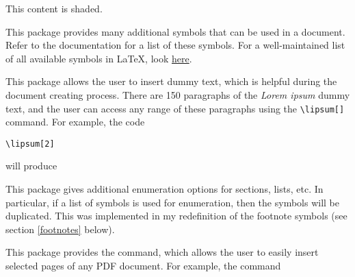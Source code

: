 \documentclass[letterpaper,12pt]{article}
\begin{document}
\begin{description}[align=margin,labelsep=0pt,leftmargin=0pt,style=multiline,labelwidth=63pt]
\begin{shaded*}
\begin{shaded*}
	This content is shaded.
\end{shaded*}
\end{shaded*}


{}
\item[\href{http://mirrors.concertpass.com/tex-archive/macros/latex/contrib/wasysym/wasysym.pdf}{\texttt{wasysym}}] This package provides many additional symbols that can be used in a document. Refer to the documentation for a list of these symbols. For a well-maintained list of all available symbols in \LaTeX , look \href{http://mirror.utexas.edu/ctan/info/symbols/comprehensive/symbols-a4.pdf}{here}.


{}
\item[\href{http://mirror.utexas.edu/ctan/macros/latex/contrib/lipsum/lipsum.pdf}{\texttt{lipsum}}] This package allows the user to insert dummy text, which is helpful during the document creating process. There are 150 paragraphs of the \emph{Lorem ipsum} dummy text, and the user can access any range of these paragraphs using the \verb|\lipsum[]| command. For example, the code

\begin{Verbatim}[frame=single,gobble=0,fontsize=\small]
\lipsum[2]
\end{Verbatim}

will produce

\begin{shaded*}
\lipsum[2]
\end{shaded*}


{}
\item[\href{http://mirrors.rit.edu/CTAN/macros/latex/contrib/oberdiek/alphalph.pdf}{\texttt{alphalph}}] This package gives additional enumeration options for sections, lists, etc. In particular, if a list of symbols is used for enumeration, then the symbols will be duplicated. This was implemented in my redefinition of the footnote symbols (see section \ref{footnotes} below).


{}
\item[\href{http://ctan.mirrorcatalogs.com/macros/latex/contrib/pdfpages/pdfpages.pdf}{\texttt{pdfpages}}] This package provides the \verb|| command, which allows the user to easily insert selected pages of any PDF document. For example, the command


\end{description}
\end{document}
